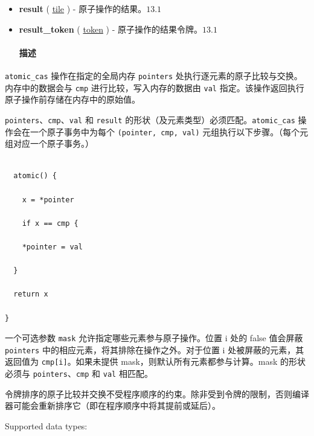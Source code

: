 \documentclass{article}
\begin{document}
\begin{itemize}
\item \textbf{result} ( \href{https://docs.nvidia.com/cuda/tile-ir/latest/sections/types.html#type-tile}{tile} ) - 原子操作的结果。$\boxed{13.1}$
\item \textbf{result\_token} ( \href{https://docs.nvidia.com/cuda/tile-ir/latest/sections/operations.html#type-token}{token} ) - 原子操作的结果令牌。$\boxed{13.1}$




\paragraph{描述}


\end{itemize}
\texttt{atomic\_cas} 操作在指定的全局内存 \texttt{pointers} 处执行逐元素的原子比较与交换。内存中的数据会与 \texttt{cmp} 进行比较，写入内存的数据由 \texttt{val} 指定。该操作返回执行原子操作前存储在内存中的原始值。



\texttt{pointers}、\texttt{cmp}、\texttt{val} 和 \texttt{result} 的形状（及元素类型）必须匹配。\texttt{atomic\_cas} 操作会在一个原子事务中为每个 \texttt{(pointer, cmp, val)} 元组执行以下步骤。（每个元组对应一个原子事务。）



\begin{lstlisting}

  atomic() {

    x = *pointer

    if x == cmp {

    *pointer = val

  }

  return x

}

\end{lstlisting}



一个可选参数 \texttt{mask} 允许指定哪些元素参与原子操作。位置 i 处的 false 值会屏蔽 \texttt{pointers} 中的相应元素，将其排除在操作之外。对于位置 i 处被屏蔽的元素，其返回值为 \texttt{cmp[i]}。如果未提供 mask，则默认所有元素都参与计算。mask 的形状必须与 \texttt{pointers}、\texttt{cmp} 和 \texttt{val} 相匹配。



令牌排序的原子比较并交换不受程序顺序的约束。除非受到令牌的限制，否则编译器可能会重新排序它（即在程序顺序中将其提前或延后）。



Supported data types:
\end{document}
